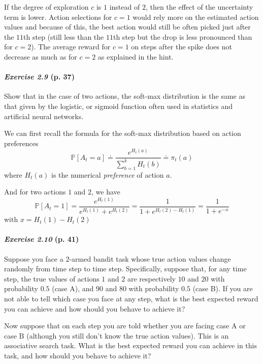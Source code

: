\documentclass[10pt,a4paper]{article}
\begin{document}
If the degree of exploration $c$ is $1$ instead of $2$, then the effect of the uncertainty term is lower. Action selections for $c=1$ would rely more on the estimated action values and because of this, the best action would still be often picked just after the $11$th step (still less than the $11$th step but the drop is less pronounced than for $c=2$). The average reward for $c=1$ on steps after the spike does not decrease as much as for $c=2$ as explained in the hint.



\paragraph{\textit{Exercise 2.9} (p. 37)} Show that in the case of two actions, the soft-max distribution is the same
as that given by the logistic, or sigmoid function often used in statistics and artificial
neural networks.

\bigskip
We can first recall the formula for the soft-max distribution based on action preferences
\begin{equation}
\mathbb{P}[A_t = a] \doteq \frac{e^{H_t(a)}}{\sum_{b=1}^k H_t(b)} \doteq \pi_t(a)
\end{equation}
where $H_t(a)$ is the numerical \textit{preference} of action $a$.

And for two actions $1$ and $2$, we have
\begin{equation}
\mathbb{P}[A_t = 1] = \frac{e^{H_t(1)}}{ e^{H_t(1)} + e^{H_t(2)}} = \frac{1}{1 +  e^{H_t(2) -  H_t(1)}} = \frac{1}{1 +  e^{-x}}
\end{equation}
with $x = H_t(1)- H_t(2)$

\paragraph{\textit{Exercise 2.10} (p. 41)} Suppose you face a $2$-armed bandit task whose true action values change randomly from time step to time step. Specifically, suppose that, for any time step, the true values of actions $1$ and $2$ are respectively $10$ and $20$ with probability $0.5$ (case
A), and $90$ and $80$ with probability $0.5$ (case B). If you are not able to tell which case you face at any step, what is the best expected reward you can achieve and how should you behave to achieve it?

Now suppose that on each step you are told whether you are facing case A or case B (although you still don't know the true action values). This is an associative search task. What is the best expected reward you can achieve in this task, and how should you behave to achieve it?
\end{document}
